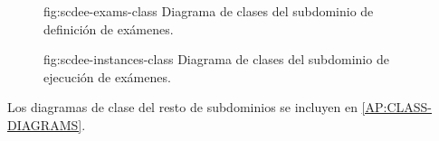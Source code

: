 \begin{figure}[Diagrama de clases: definición de exámenes]%
              {fig:scdee-exams-class}%
              {Diagrama de clases del subdominio de definición de exámenes.}
\end{figure}

\begin{figure}[Diagrama de clases: ejecución de exámenes]%
              {fig:scdee-instances-class}%
              {Diagrama de clases del subdominio de ejecución de exámenes.}
\end{figure}

Los diagramas de clase del resto de subdominios se incluyen en
\cref{AP:CLASS-DIAGRAMS}.

